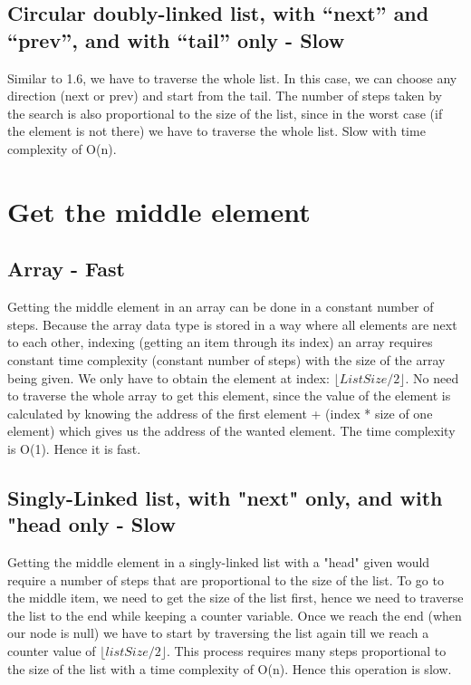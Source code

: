\documentclass{article}
\begin{document}
\subsection{Circular doubly-linked list, with “next” and “prev”, and with “tail” only - Slow}
Similar to 1.6, we have to traverse the whole list. In this case, we can choose any direction (next or prev) and start from the tail. The number of steps taken by the search is also proportional to the size of the list, since in the worst case (if the element is not there) we have to traverse the whole list. Slow with time complexity of O(n).



\section{Get the middle element}
\subsection{Array - Fast}
Getting the middle element in an array can be done in a constant number of steps. Because the array data type is stored in a way where all elements are next to each other, indexing (getting an item through its index) an array requires constant time complexity (constant number of steps) with the size of the array being given. We only have to obtain the element at index: $\lfloor {ListSize/2} \rfloor$. No need to traverse the whole array to get this element, since the value of the element is calculated by knowing the address of the first element + (index * size of one element) which gives us the address of the wanted element. The time complexity is O(1). Hence it is fast.

\subsection{Singly-Linked list, with "next" only, and with "head only - Slow}
Getting the middle element in a singly-linked list with a "head" given would require a number of steps that are proportional to the size of the list. To go to the middle item, we need to get the size of the list first, hence we need to traverse the list to the end while keeping a counter variable. Once we reach the end (when our node is null) we have to start by traversing the list again till we reach a counter value of $\lfloor {listSize/2} \rfloor$. This process requires many steps proportional to the size of the list with a time complexity of O(n). Hence this operation is slow.
\end{document}
